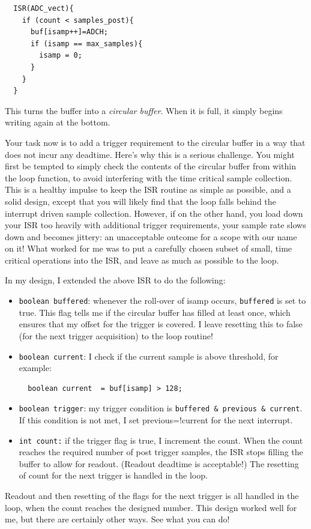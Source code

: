 \documentclass[12pt]{article}
\begin{document}
\begin{verbatim}
  ISR(ADC_vect){
    if (count < samples_post){
      buf[isamp++]=ADCH;
      if (isamp == max_samples){
        isamp = 0;
      }  
    }
  }
\end{verbatim}

This turns the buffer into a {\em circular buffer}.  When it is full, it simply begins writing again at the bottom.

Your task now is to add a trigger requirement to the circular buffer in a way that does not incur any deadtime.  Here's why this is a serious challenge.  You might first be tempted to simply check the contents of the circular buffer from within the loop function, to avoid interfering with the time critical sample collection.  This is a healthy impulse to keep the ISR routine as simple as possible, and a solid design, except that you will likely find that the loop falls behind the interrupt driven sample collection.  However, if on the other hand, you load down your ISR too heavily with additional trigger requirements, your sample rate slows down and becomes jittery:  an unacceptable outcome for a scope with our name on it!  What worked for me was to put a carefully chosen subset of small, time critical operations into the ISR, and leave as much as possible to the loop.

In my design, I extended the above ISR to do the following:
\begin{itemize}
\item {\tt boolean buffered}:  whenever the roll-over of isamp occurs, {\tt buffered} is set to true.   This flag tells me if the circular buffer has filled at least once, which ensures that my offset for the trigger is covered.
I leave resetting this to false (for the next trigger acquisition) to the loop routine!
\item {\tt boolean current}:  I check if the current sample is above threshold, for example:
\begin{verbatim}
  boolean current  = buf[isamp] > 128;
\end{verbatim} 
\item {\tt boolean trigger}: my trigger condition is  {\tt buffered \& previous \& current}.  If this condition is not met, I set previous=!current for the next interrupt.
\item {\tt int count:}  if the trigger flag is true, I increment the count.  When the count reaches the required number of post trigger samples, the ISR stops filling the buffer to allow for readout.  (Readout deadtime is acceptable!)  The resetting of count for the next trigger is handled in the loop.
\end{itemize} 
Readout and then resetting of the flags for the next trigger is all handled in the loop, when the count reaches the designed number.  This design worked well for me, but there are certainly other ways.  See what you can do!
\end{document}
